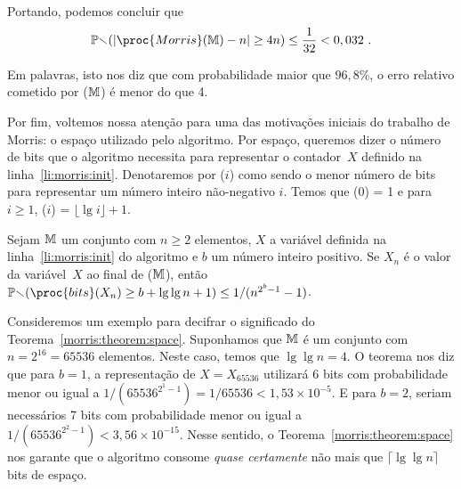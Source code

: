 Portando, podemos concluir que 
\[ \Pbb(|\proc{Morris}(\Mbb) - n| \geq 4n) \leq \frac{1}{32} < 0,032 \ . \]

Em palavras, isto nos diz que com probabilidade maior que $96,8\%$, o erro relativo cometido por ($\mathbb{M}$) é
menor do que 4.

Por fim, voltemos nossa atenção para uma das motivações iniciais do trabalho de Morris: o espaço utilizado pelo 
algoritmo. Por espaço, queremos dizer o número de bits que o algoritmo  necessita para representar o 
contador~$X$ definido na linha~\ref{li:morris:init}. Denotaremos por ($i$) como sendo o menor número de bits
para representar um número inteiro não-negativo $i$. Temos que (0) = 1 e para $i \geq 1$, ($i$) = 
$\lfloor\lg i\rfloor + 1$.

\begin{theorem}
  \label{morris:theorem:space}
  Sejam $\mathbb{M}$ um conjunto com $n \geq 2$ elementos, $X$ a variável definida na linha~\ref{li:morris:init} do algoritmo
   e $b$ um número inteiro positivo. Se $X_n$ é o valor da variável~$X$ ao final de ($\mathbb{M}$), 
  então $\Pbb(\proc{bits}(X_n) \geq b + \lg\lg n + 1) \leq 1/(n^{2^b-1}-1)$.
\end{theorem}

Consideremos um exemplo para decifrar o significado do Teorema~\ref{morris:theorem:space}. Suponhamos que $\mathbb{M}$ é um 
conjunto com $n = 2^{16} = 65536$ elementos. Neste caso, temos que $\lg \lg n = 4$. O teorema nos diz que para $b = 1$,
a representação de $X = X_{65536}$ utilizará 6 bits com probabilidade menor ou igual a 
$1/(65536^{2^1 - 1}) = 1/65536 < 1,53 \times 10^{-5}$. E para $b = 2$, seriam necessários 7 bits com probabilidade menor
ou igual a $1/(65536^{2^2 - 1}) < 3,56 \times 10^{-15}$. Nesse sentido, o Teorema~\ref{morris:theorem:space} nos garante 
que o algoritmo  consome \textit{quase certamente} não mais que $\lceil\lg \lg n\rceil$ bits de espaço.

